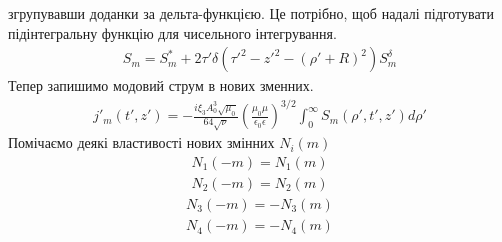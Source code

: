 згрупувавши доданки за дельта-функцією. Це потрібно, щоб надалі 
підготувати підінтегральну функцію для чисельного інтегрування.
%
\begin{equation*} \begin{aligned}
S_m = S_m^* + 2 \tau' \delta 
\left( {\tau'}^2 - {z'}^2 - (\rho' + R)^2 \right) S_m^\delta
\end{aligned} \end{equation*}
%
Тепер запишимо модовий струм в нових зменних.
%
\begin{equation*} \begin{aligned}
j'_m (t',z') = - \frac{i \xi_3 A_0^3 \sqrt{\mu_0}}{64 \sqrt{\nu}}
\left( \frac{\mu_0 \mu} {\epsilon_0 \epsilon} \right)^{3/2}
\int_{0}^{\infty} S_{m} (\rho',t',z') d \rho'
\end{aligned} \end{equation*}
%
Помічаємо деякі властивості нових змінних $ N_i(m) $
%
\begin{equation*} \begin{aligned}
N_{1} (-m) = N_{1} (m)
\end{aligned} \end{equation*}
%
\begin{equation*} \begin{aligned}
N_{2} (-m) = N_{2} (m)
\end{aligned} \end{equation*}
%
\begin{equation*} \begin{aligned}
N_{3} (-m) = - N_{3} (m)
\end{aligned} \end{equation*}
%
\begin{equation*} \begin{aligned}
N_{4} (-m) = - N_{4} (m)
\end{aligned} \end{equation*}

